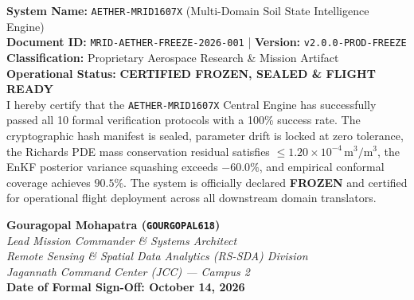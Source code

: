 \documentclass[11pt,a4paper]{article}
\theoremstyle{definition}
\theoremstyle{remark}
\begin{document}
\begin{tcolorbox}[colback=blue!5!white,colframe=blue!75!black,title=\textbf{JAGANNATH COMMAND CENTER (JCC) --- FLIGHT READINESS CERTIFICATION}]
\textbf{System Name:} \texttt{AETHER-MRID1607X} (Multi-Domain Soil State Intelligence Engine)\\
\textbf{Document ID:} \texttt{MRID-AETHER-FREEZE-2026-001} \quad | \quad \textbf{Version:} \texttt{v2.0.0-PROD-FREEZE}\\
\textbf{Classification:} Proprietary Aerospace Research \& Mission Artifact\\
\textbf{Operational Status:} \textbf{CERTIFIED FROZEN, SEALED \& FLIGHT READY}\\

\vspace{0.2cm}
I hereby certify that the \texttt{AETHER-MRID1607X} Central Engine has successfully passed all 10 formal verification protocols with a 100\% success rate. The cryptographic hash manifest is sealed, parameter drift is locked at zero tolerance, the Richards PDE mass conservation residual satisfies $\le 1.20 \times 10^{-4}\,\text{m}^3/\text{m}^3$, the EnKF posterior variance squashing exceeds $-60.0\%$, and empirical conformal coverage achieves $90.5\%$. The system is officially declared \textbf{FROZEN} and certified for operational flight deployment across all downstream domain translators.

\vspace{0.4cm}
\begin{center}
    \textbf{Gouragopal Mohapatra (\texttt{GOURGOPAL618})}\\
    \textit{Lead Mission Commander \& Systems Architect}\\
    \textit{Remote Sensing \& Spatial Data Analytics (RS-SDA) Division}\\
    \textit{Jagannath Command Center (JCC) --- Campus 2}\\
    \textbf{Date of Formal Sign-Off: October 14, 2026}
\end{center}
\end{tcolorbox}
\end{document}
